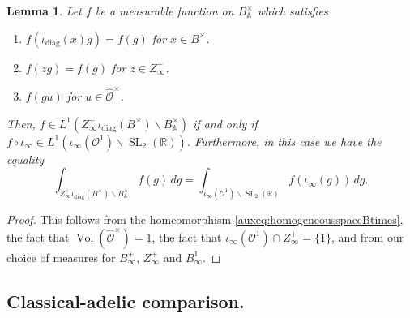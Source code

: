 \documentclass{article}
\newtheorem{lem}{Lemma}[section]
\theoremstyle{named}
\newcommand{\A}{\mathbb{A}}
\newcommand{\R}{\mathbb{R}}
\renewcommand{\O}{\mathcal{O}}
\DeclareMathOperator{\SL}{SL}
\DeclareMathOperator{\vol}{Vol}
\DeclareMathOperator{\diag}{diag}
\begin{document}
\begin{lem}\label{lem:computationadelicintegralBtimes}
    Let $f$ be a measurable function on $B_\A^\times$ which satisfies
\begin{enumerate}
    \item [i)] $f(\iota_{\diag}(x)g) = f(g)$ for $x \in B^\times$.
    \item [ii)] $f(zg) = f(g)$ for $z \in Z_\infty^+$.
    \item [iii)] $f(gu)$ for $u \in \widehat{\O}^\times$. 
\end{enumerate}
Then, $f \in L^1(Z_\infty^+\iota_{\diag}(B^\times)\backslash B_\A^\times)$ if and only if $f \circ \iota_\infty \in L^1(\iota_\infty(\O^1) \backslash \SL_2(\R))$. Furthermore, in this case we have the equality
\begin{equation}\label{eq:integralshomogeneousspaces}
    \int_{Z_\infty^+ \iota_{\diag}(B^\times)\backslash B_\A^\times} f(g) \, dg = \int_{\iota_{\infty}(\O^1)\backslash \SL_2(\R)} f(\iota_\infty(g)) \, dg.
\end{equation}
\end{lem}

\begin{proof}
This follows from the homeomorphism \eqref{auxeq:homogeneousspaceBtimes}, the fact that $\vol(\widehat{\O}^\times) = 1$, the fact that $\iota_\infty(\O^1)\cap Z_\infty^+ = \{1\}$, and from our choice of measures for $B_\infty^+$, $Z_\infty^+$ and $B_\infty^1$.
\end{proof}

\subsection{Classical-adelic comparison.}
\end{document}
